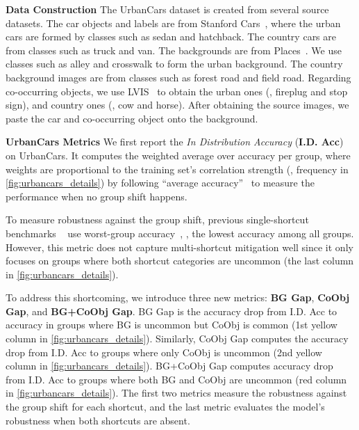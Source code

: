 \documentclass[10pt,twocolumn,letterpaper]{article}
\begin{document}
\noindent \textbf{Data Construction} \quad The UrbanCars dataset is created from several source datasets.
The car objects and labels are from Stanford Cars~\cite{krause2013IEEEInt.Conf.Comput.Vis.Workshop3D}, where the urban cars are formed by classes such as sedan and hatchback. The country cars are from classes such as truck and van.
The backgrounds are from Places~\cite{zhou2018IEEETrans.PatternAnal.Mach.Intell.Places}. We use classes such as alley and crosswalk to form the urban background. The country background images are from classes such as forest road and field road.
Regarding co-occurring objects, we use LVIS~\cite{gupta2019IEEECVFConf.Comput.Vis.PatternRecognit.CVPRLVIS} to obtain the urban ones (\eg, fireplug and stop sign), and country ones (\eg, cow and horse). After obtaining the source images, we paste the car and co-occurring object onto the background.

\noindent \textbf{UrbanCars Metrics} \quad We first report the \textit{In Distribution Accuracy} (\textbf{I.D. Acc}) on UrbanCars. It computes the weighted average over accuracy per group, where weights are proportional to the training set's correlation strength (\ie, frequency in \cref{fig:urbancars_details}) by following ``average accuracy''~\cite{sagawa2020Int.Conf.Learn.Represent.Distributionally} to measure the performance when no group shift happens.

To measure robustness against the group shift, previous single-shortcut benchmarks ~\cite{creager2021Int.Conf.Mach.Learn.Environment,liu2021Int.Conf.Mach.Learn.Just,sagawa2020Int.Conf.Learn.Represent.Distributionally} use worst-group accuracy~\cite{sagawa2020Int.Conf.Learn.Represent.Distributionally}, \ie, the lowest accuracy among all groups. However, this metric does not capture multi-shortcut mitigation well since it only focuses on groups where both shortcut categories are uncommon (\cf the last column in \cref{fig:urbancars_details}).

To address this shortcoming, we introduce three new metrics: \textbf{BG Gap}, \textbf{CoObj Gap}, and \textbf{BG+CoObj Gap}. BG Gap is the accuracy drop from I.D. Acc to accuracy in groups where BG is uncommon but CoObj is common (\cf 1st yellow column in \cref{fig:urbancars_details}). Similarly, CoObj Gap computes the accuracy drop from I.D. Acc to groups where only CoObj is uncommon (\cf 2nd yellow column in \cref{fig:urbancars_details}). BG+CoObj Gap computes accuracy drop from I.D. Acc to groups where both BG and CoObj are uncommon (\cf red column in \cref{fig:urbancars_details}). The first two metrics measure the robustness against the group shift for each shortcut, and the last metric evaluates the model's robustness when both shortcuts are absent.
\end{document}
